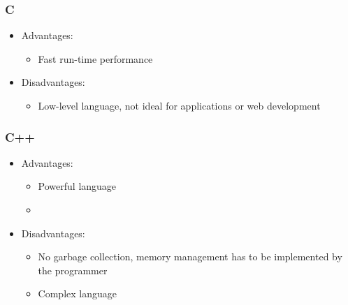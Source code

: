 \documentclass[12pt, letterpaper, twoside]{article}
\begin{document}
			\subsubsection{C}
			
				\begin{itemize}
					\item Advantages:
						\begin{itemize}
							\item Fast run-time performance
						\end{itemize}
						
					\item Disadvantages:
						\begin{itemize}
							\item Low-level language, not ideal for applications or web development
						\end{itemize}
				\end{itemize}
				
			\subsubsection{C++}
			
				\begin{itemize}
					\item Advantages:
						\begin{itemize}
							\item Powerful language
							\item 
						\end{itemize}
						
					\item Disadvantages:
						\begin{itemize}
							\item No garbage collection, memory management has to be implemented by the programmer
							\item Complex language
						\end{itemize}
				\end{itemize}
				
\end{document}
